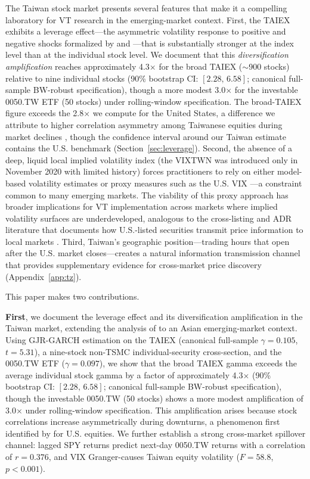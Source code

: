 The Taiwan stock market presents several features that make it a compelling laboratory for VT research in the emerging-market context. First, the TAIEX exhibits a leverage effect---the asymmetric volatility response to positive and negative shocks formalized by \citet{black1976} and \citet{glosten1993}---that is substantially stronger at the index level than at the individual stock level. We document that this \textit{diversification amplification} reaches approximately 4.3$\times$ for the broad TAIEX ($\sim$900 stocks) relative to nine individual stocks (90\% bootstrap CI: $[2.28, \, 6.58]$; canonical full-sample BW-robust specification), though a more modest 3.0$\times$ for the investable 0050.TW ETF (50 stocks) under rolling-window specification. The broad-TAIEX figure exceeds the 2.8$\times$ we compute for the United States, a difference we attribute to higher correlation asymmetry among Taiwanese equities during market declines \citep{ang2002}, though the confidence interval around our Taiwan estimate contains the U.S. benchmark (Section~\ref{sec:leverage}). Second, the absence of a deep, liquid local implied volatility index (the VIXTWN was introduced only in November 2020 with limited history) forces practitioners to rely on either model-based volatility estimates or proxy measures such as the U.S. VIX \citep{whaley2000,whaley2009}---a constraint common to many emerging markets. The viability of this proxy approach has broader implications for VT implementation across markets where implied volatility surfaces are underdeveloped, analogous to the cross-listing and ADR literature that documents how U.S.-listed securities transmit price information to local markets \citep{gagnon2010}. Third, Taiwan's geographic position---trading hours that open after the U.S. market closes---creates a natural information transmission channel \citep{eun1989,hamao1990,lin1994} that provides supplementary evidence for cross-market price discovery (Appendix~\ref{app:tz}).

This paper makes two contributions.

\textbf{First}, we document the leverage effect and its diversification amplification in the Taiwan market, extending the analysis of \citet{ang2002} to an Asian emerging-market context. Using GJR-GARCH estimation on the TAIEX (canonical full-sample $\gamma = 0.105$, $t = 5.31$), a nine-stock non-TSMC individual-security cross-section, and the 0050.TW ETF ($\gamma = 0.097$), we show that the broad TAIEX gamma exceeds the average individual stock gamma by a factor of approximately 4.3$\times$ (90\% bootstrap CI: $[2.28, \, 6.58]$; canonical full-sample BW-robust specification), though the investable 0050.TW (50 stocks) shows a more modest amplification of 3.0$\times$ under rolling-window specification. This amplification arises because stock correlations increase asymmetrically during downturns, a phenomenon first identified by \citet{ang2002} for U.S. equities. We further establish a strong cross-market spillover channel: lagged SPY returns predict next-day 0050.TW returns with a correlation of $r = 0.376$, and VIX Granger-causes Taiwan equity volatility ($F = 58.8$, $p < 0.001$).

